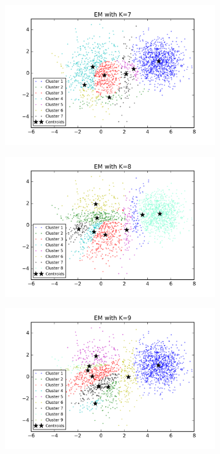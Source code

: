 \begin{description}
\begin{description}
\begin{figure}[!h]
\begin{subfigure}[b]{0.475\textwidth}
            \includegraphics[width=\textwidth]{./figures/clustering_EM_7.png}
        \end{subfigure}
        \hfill
        \begin{subfigure}[b]{0.475\textwidth}  
            \centering 
            \includegraphics[width=\textwidth]{./figures/clustering_EM_8.png}
        \end{subfigure}
        \begin{subfigure}[b]{0.475\textwidth}   
            \centering 
            \includegraphics[width=\textwidth]{./figures/clustering_EM_9.png}

\end{subfigure}
\end{figure}
\end{description}
\end{description}
